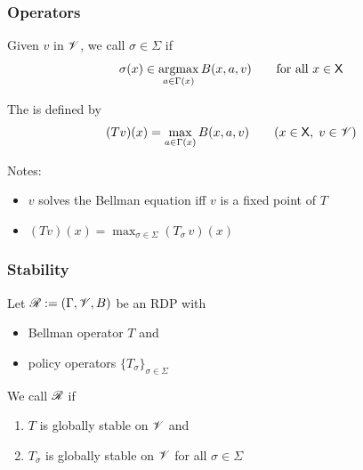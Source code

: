 \begin{frame}
    \frametitle{Operators}

    Given $v$ in $\mathscr V$, we call $\sigma \in \Sigma$   if 
    \begin{equation*}
        \sigma(x) \in \argmax_{a \in \Gamma(x)} B(x, a, v)
        \qquad \text{for all } x \in \Xsf
    \end{equation*}

              \vspace{0.5em}
    The  is defined by
    \begin{equation*}
        (T v)(x) = \max_{a \in \Gamma(x)} B(x, a, v)
        \qquad (x \in \mathsf X, \; v \in \mathscr V)
    \end{equation*}

          \vspace{0.5em}

    Notes:
    \begin{itemize}
        \item $v$ solves the Bellman equation iff $v$ is a fixed point of $T$
          \vspace{0.5em}
        \item $(Tv)(x) = \max_{\sigma \in \Sigma} (T_\sigma \, v)(x)$
    \end{itemize}


\end{frame}


\begin{frame}
    \frametitle{Stability}
    
    Let $\mathscr R := (\Gamma, \mathscr V, B)$ be an RDP with 
    \begin{itemize}
        \item Bellman operator $T$ and 
        \item policy operators $\{T_\sigma\}_{\sigma \in \Sigma}$
    \end{itemize}


        \vspace{0.5em}
        \vspace{0.5em}
        \vspace{0.5em}
    We call $\mathscr R$  if
    \begin{enumerate}
        \item $T$ is globally stable on $\mathscr V$ and
        \vspace{0.5em}
        \item $T_\sigma$ is globally stable on $\mathscr V$ for all $\sigma \in \Sigma$
    \end{enumerate}

\end{frame}



